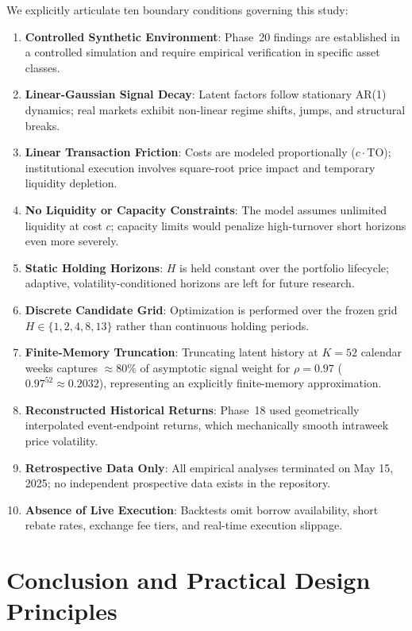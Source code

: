\documentclass[11pt,a4paper]{article}
\theoremstyle{definition}
\begin{document}
We explicitly articulate ten boundary conditions governing this study:
\begin{enumerate}
    \item \textbf{Controlled Synthetic Environment}: Phase~20 findings are established in a controlled simulation and require empirical verification in specific asset classes.
    \item \textbf{Linear-Gaussian Signal Decay}: Latent factors follow stationary AR(1) dynamics; real markets exhibit non-linear regime shifts, jumps, and structural breaks.
    \item \textbf{Linear Transaction Friction}: Costs are modeled proportionally ($c \cdot \text{TO}$); institutional execution involves square-root price impact and temporary liquidity depletion.
    \item \textbf{No Liquidity or Capacity Constraints}: The model assumes unlimited liquidity at cost $c$; capacity limits would penalize high-turnover short horizons even more severely.
    \item \textbf{Static Holding Horizons}: $H$ is held constant over the portfolio lifecycle; adaptive, volatility-conditioned horizons are left for future research.
    \item \textbf{Discrete Candidate Grid}: Optimization is performed over the frozen grid $H \in \{1, 2, 4, 8, 13\}$ rather than continuous holding periods.
    \item \textbf{Finite-Memory Truncation}: Truncating latent history at $K = 52$ calendar weeks captures $\approx 80\%$ of asymptotic signal weight for $\rho = 0.97$ ($0.97^{52} \approx 0.2032$), representing an explicitly finite-memory approximation.
    \item \textbf{Reconstructed Historical Returns}: Phase~18 used geometrically interpolated event-endpoint returns, which mechanically smooth intraweek price volatility.
    \item \textbf{Retrospective Data Only}: All empirical analyses terminated on May 15, 2025; no independent prospective data exists in the repository.
    \item \textbf{Absence of Live Execution}: Backtests omit borrow availability, short rebate rates, exchange fee tiers, and real-time execution slippage.
\end{enumerate}


\section{Conclusion and Practical Design Principles}
\label{sec:conclusion}
\end{document}
